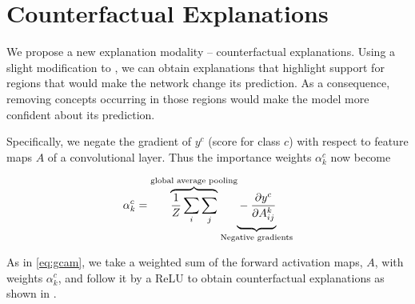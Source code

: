 \section{Counterfactual Explanations}
We propose a new explanation modality -- counterfactual explanations.
Using a slight modification to \gcam{}, we can obtain explanations
that highlight support for regions that would make the network change its prediction.
As a consequence, removing concepts occurring in those regions would make the
model more confident about its prediction.

Specifically, we negate the gradient of $y^c$ (score for class $c$) with respect to feature maps $A$ of a convolutional layer.
Thus the importance weights $\alpha{}_{k}^{c}$ now become
\begin{ceqn}
\begin{equation} \label{eq:alpha_neg}
    \alpha{}_{k}^c =
    \overbrace{
        \frac{1}{Z}\sum_{i}\sum_{j}
    }^{\text{global average pooling}}
    \hspace{-17pt}
    \underbrace{
        \vphantom{\sum_{i}\sum_{j}} -\frac{\partial y^c}{\partial A_{ij}^{k}}
    }_{\text{Negative gradients}}
\end{equation}
\end{ceqn}
As in \eqref{eq:gcam}, we take a weighted sum of the forward activation maps, $A$, with weights $\alpha{}_{k}^c$, and follow it by a ReLU to obtain counterfactual explanations as shown in .

